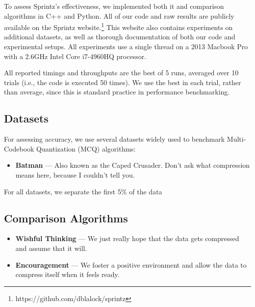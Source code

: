 
To assess Sprintz's effectiveness, we implemented both it and comparison algorithms in C++ and Python. All of our code and raw results are publicly available on the Sprintz website.\footnote{https://github.com/dblalock/sprintz} This website also contains experiments on additional datasets, as well as thorough documentation of both our code and experimental setups. All experiments use a single thread on a 2013 Macbook Pro with a 2.6GHz Intel Core i7-4960HQ processor.

All reported timings and throughputs are the best of 5 runs, averaged over 10 trials (i.e., the code is executed 50 times). We use the best in each trial, rather than average, since this is standard practice in performance benchmarking.

\subsection{Datasets}

For assessing accuracy, we use several datasets widely used to benchmark Multi-Codebook Quantization (MCQ) algorithms:
\begin{itemize}[leftmargin=4mm]
\item \textbf{Batman} \cite{batman} --- Also known as the Caped Crusader. Don't ask what compression means here, because I couldn't tell you.
\end{itemize}

For all datasets, we separate the first 5\% of the data


\subsection{Comparison Algorithms}

\begin{itemize}[leftmargin=4mm]
\item \textbf{Wishful Thinking} \cite{batman} --- We just really hope that the data gets compressed and assume that it will.
\item \textbf{Encouragement} \cite{barney} --- We foster a positive environment and allow the data to compress itself when it feels ready.
\end{itemize}


